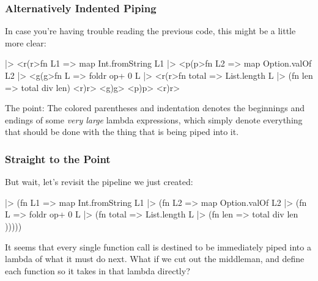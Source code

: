 \documentclass[aspectratio=169, handout]{beamer}
\begin{document}
\begin{frame}[fragile]
  \frametitle{Alternatively Indented Piping}

  In case you're having trouble reading the previous code, this might be
  a little more clear:

  \begin{codeblock}
    ["1", "2", "3"] |> <r(r>fn L1 =>    
      map Int.fromString L1 |> <p(p>fn L2 =>    
        map Option.valOf L2 |> <g(g>fn L =>     
          foldr op+ 0 L |> <r(r>fn total => 
            List.length L |> (fn len => total div len)
          <r)r>
        <g)g>
      <p)p>
    <r)r>
  \end{codeblock}

  \pause
  \vspace{\fill}

  The point: The colored parentheses and indentation denotes the beginnings
  and endings of some \textit{very large} lambda expressions, which simply
  denote everything that should be done with the thing that is being piped
  into it.
\end{frame}

\begin{frame}[fragile]
  \frametitle{Straight to the Point}

  But wait, let's revisit the pipeline we just created:

  \begin{codeblock}
    ["1", "2", "3"]       |> (fn L1 =>    
    map Int.fromString L1 |> (fn L2 =>    
    map Option.valOf L2   |> (fn L =>     
    foldr op+ 0 L         |> (fn total => 
    List.length L         |> (fn len =>   
    total div len         )))))
  \end{codeblock}

  \pause
  \vspace{\fill}

  It seems that every single function call is destined to be immediately 
  piped into a lambda of what it must do next. What if we cut out 
  the middleman, and define each function so it takes in that lambda directly? 
\end{frame}
\end{document}
